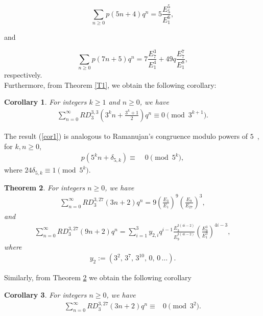 \documentclass[11pt,a4paper]{article}
\numberwithin{equation}{section}
\theoremstyle{plain}
\newtheorem{theorem}{Theorem}[section]
\newtheorem{corollary}[theorem]{Corollary}
\begin{document}
	\begin{equation*}
		\sum_{n\ge0} p(5n+4)q^n
		=
		5\frac{E_5^5}{E_1^6},
	\end{equation*}
	
	and
	
	\begin{equation*}
		\sum_{n\ge0} p(7n+5)q^n
		=
		7\frac{E_7^3}{E_1^4}
		+49q\frac{E_7^7}{E_1^8},
	\end{equation*}
	respectively.\\
	Furthermore, from Theorem \ref{T1}, we obtain the following corollary: 
	\begin{corollary}\label{coro1}
			For integers $k \geq 1$ and $n \geq 0$, we have
		\begin{align}
				\sum_{n=0}^{\infty}RD_3^{3,3}\left(3^kn+\frac{3^k+1}{2}\right)q^n\equiv0 \pmod{3^{k+1}}.\label{cor1}
		\end{align}
	\end{corollary}
	The result (\ref{cor1}) is analogous to Ramanujan's congruence modulo powers of $5$~\cite{Ramanujan}, for $k,n \geq 0$, 
	\begin{align*}
			p(5^kn+\delta_{5,k})\equiv&\; 0 \pmod{5^k},
	\end{align*}
where $24\delta_{5,k}\equiv1\pmod{5^k}$.
\begin{theorem}For integers $n \geq 0$, we have \label{t3}
	\begin{align} 
		\sum_{n=0}^{\infty}RD_3^{3,27}\left(3n+2\right)q^n=9\left(\frac{E_3}{E_1}\right)^9\left(\frac{E_9}{E_{27}}\right)^3, \label{T3.1}
	\end{align}
	and 
	\begin{align}
		\sum_{n=0}^{\infty}RD_3^{3,27}\left(9n+2\right)q^n=\sum_{i=1}^{3}y_{2,i}q^{i-1}\frac{E_3^{3(4i-2)}}{E_9^{3(4i-2)}}\left(\frac{E_9^3}{E_1^3}\right)^{4i-3}, \label{T3.2}
		\end{align}
			where
			\begin{align*}
					y_2 := (3^2,\,3^7,\,3^{10},\,0,\,0\,\ldots).
			\end{align*}
		\end{theorem}
		Similarly, from Theorem \ref{t3} we obtain the following corollary
\begin{corollary}
	For integers $n \geq 0$, we have
	\begin{align*}
		\sum_{n=0}^{\infty}RD_3^{3,27}\left(3n+2\right)q^n\equiv&0\pmod{3^2}.
			\end{align*}

\end{corollary}
\end{document}
